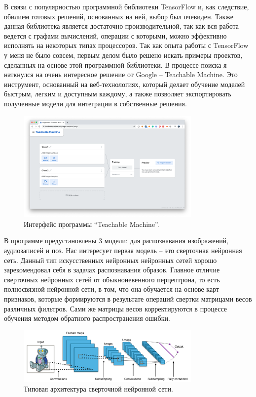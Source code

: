В связи с популярностью программной библиотеки TensorFlow и, как следствие, обилием готовых решений, основанных на ней, выбор был очевиден. Также данная библиотека является достаточно производительной, так как вся работа ведется с графами вычислений, операции с которыми, можно эффективно исполнять на некоторых типах процессоров.  Так как опыта работы с TensorFlow у меня не было совсем, первым делом было решено искать примеры проектов, сделанных на основе этой программной библиотеки. В процессе поиска я наткнулся на очень интересное решение от Google – Teachable Machine. Это инструмент, основанный на веб-технологиях, который делает обучение моделей быстрым, легким и доступным каждому, а также позволяет экспортировать полученные модели для интеграции в собственные решения.

\begin{figure}[H]
    \begin{center}
        \includegraphics[width=0.8\textwidth]{max_kt2_images/image10.png}
    \end{center}
    \caption{Интерфейс программы “Teachable Machine”.}
\end{figure}

В программе предустановлены 3 модели: для распознавания изображений, аудиозаписей и поз. Нас интересует первая модель – это сверточная нейронная сеть. Данный тип искусственных нейронных нейронных сетей хорошо зарекомендовал себя в задачах распознавания образов. Главное отличие сверточных нейронных сетей от обыкноневенного перцептрона, то есть полносвязной нейронной сети, в том, что она обучается на основе карт признаков, которые формируются в результате операций свертки матрицами весов различных фильтров. Сами же матрицы весов корректируются в процессе обучения методом обратного распространения ошибки.

\begin{figure}[H]
    \begin{center}
        \includegraphics[width=0.8\textwidth]{max_kt2_images/image7.png}
    \end{center}
    \caption{Типовая архитектура сверточной нейронной сети.}
\end{figure}

